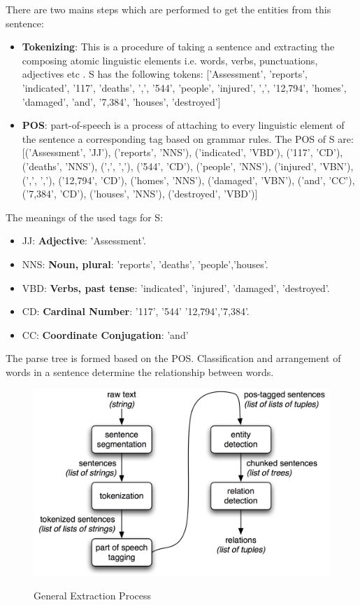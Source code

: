 There are two mains steps which are performed to get the entities from   this sentence:
\begin{itemize}
\item \textbf{Tokenizing}: This is a procedure of taking a sentence and extracting the composing atomic linguistic elements i.e. words, verbs, punctuations, adjectives etc .
S has the following tokens: ['Assessment', 'reports', 'indicated', '117', 'deaths', ',', '544', 'people', 'injured', ',', '12,794', 'homes', 'damaged', 'and', '7,384', 'houses', 'destroyed']
\item \textbf{POS}: part-of-speech is a process of attaching to every linguistic element of the sentence a corresponding tag
based on grammar rules.
The POS of S  are: 
[('Assessment', 'JJ'), ('reports', 'NNS'), ('indicated', 'VBD'), ('117', 'CD'), ('deaths', 'NNS'), (',', ','), ('544', 'CD'), ('people', 'NNS'), ('injured', 'VBN'), (',', ','), ('12,794', 'CD'), ('homes', 'NNS'), ('damaged', 'VBN'), ('and', 'CC'), ('7,384', 'CD'), ('houses', 'NNS'), ('destroyed', 'VBD')]
\end{itemize}
The meanings of the used tags for S:
\begin{itemize}
\item JJ: \textbf{Adjective}: 'Assessment'.
\item NNS: \textbf{Noun, plural}: 'reports', 'deaths', 'people','houses'.
\item VBD: \textbf{Verbs, past tense}: 'indicated',             'injured', 'damaged', 'destroyed'.
\item CD: \textbf{Cardinal Number}: '117', '544' '12,794','7,384'.
\item CC: \textbf{Coordinate Conjugation}: 'and'
\end{itemize}
The parse tree is formed based on the POS. Classification and arrangement of words in a sentence determine the relationship between words. 
\begin{figure}[hbtp]
\caption{General Extraction Process \citep{bird2009natural} }
\centering
\includegraphics[scale=0.7]{images/pos.png}\label{tree}
\end{figure}

